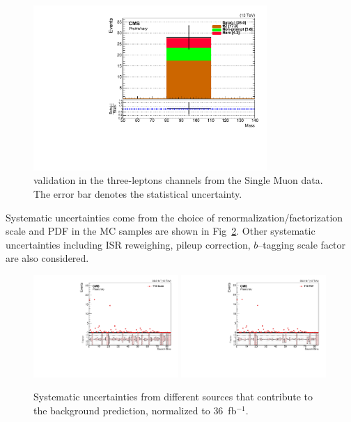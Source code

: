 \begin{figure}[htbp]
  \begin{center}
    \includegraphics[width=0.79\textwidth]{sections/mc4/Backgrounds/TTZRare/figures/RecoZMass_7.pdf}
  \end{center}
  \caption{\ttbarZ validation in the three-leptons channels from the
  Single Muon data. The error bar denotes the statistical uncertainty.}
  \label{fig:ttZSUSY}
\end{figure}


Systematic uncertainties come from the choice of renormalization/factorization
scale and PDF in the \ttbarZ MC samples are shown in
Fig~\ref{fig:ttZSysUncern}.  Other systematic uncertainties including ISR
reweighing, pileup correction, $b$--tagging scale factor are also considered.


\begin{figure}[htbp]
  \begin{center}
    \includegraphics[width=0.49\textwidth]{sections/mc4/Backgrounds/TTZRare/figures/TTZ_Scale.pdf}
    \includegraphics[width=0.49\textwidth]{sections/mc4/Backgrounds/TTZRare/figures/TTZ_PDF.pdf}
  \end{center}
  \caption{Systematic uncertainties from different sources that contribute to 
  the \ttbarZ background prediction, normalized to $36$~fb$^{-1}$.}
  \label{fig:ttZSysUncern}
\end{figure}

